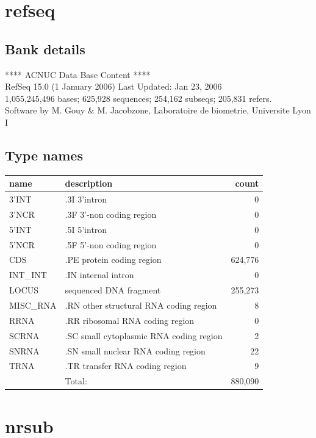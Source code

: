 \documentclass{article}
\begin{document}
\begin{Schunk}
\section{ refseq }
\subsection{Bank details}
             ****     ACNUC Data Base Content      ****                         \\
               RefSeq 15.0 (1 January 2006) Last Updated: Jan 23, 2006\\
1,055,245,496 bases; 625,928 sequences; 254,162 subseqs; 205,831 refers.\\
Software by M. Gouy \& M. Jacobzone, Laboratoire de biometrie, Universite Lyon I 

\subsection{Type names}
\noindent\begin{tabular}{llr}
\hline \hline
name & description & count \\
\hline
3'INT  &  .3I 3'intron  &  0 \\
3'NCR  &  .3F  3'-non coding region  &  0 \\
5'INT  &  .5I 5'intron  &  0 \\
5'NCR  &  .5F  5'-non coding region  &  0 \\
CDS  &  .PE protein coding region  &  624,776 \\
INT\_INT  &  .IN  internal intron  &  0 \\
LOCUS  &  sequenced DNA fragment  &  255,273 \\
MISC\_RNA  &  .RN other structural RNA coding region  &  8 \\
RRNA  &  .RR ribosomal RNA coding region  &  0 \\
SCRNA  &  .SC small cytoplasmic RNA coding region  &  2 \\
SNRNA  &  .SN small nuclear RNA coding region  &  22 \\
TRNA  &  .TR transfer RNA coding region  &  9 \\
\hline
 & Total: & 880,090 \\
\hline \hline
\end{tabular}

\section{ nrsub }

\end{Schunk}
\end{document}
